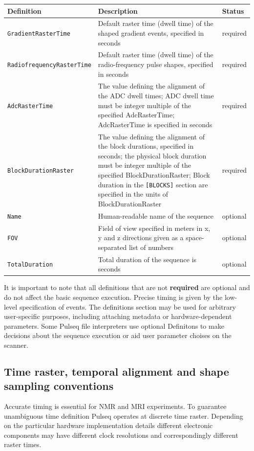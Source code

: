 \documentclass{article}
\begin{document}
\begin{tabularx}{\textwidth}{lXl}
\toprule
Definition & Description & Status\\
\midrule
\verb.GradientRasterTime. & Default raster time (dwell time) of the shaped gradient events, specified in seconds & required \\
\verb.RadiofrequencyRasterTime. & Default raster time (dwell time) of the radio-frequency pulse shapes, specified in seconds & required \\
\verb.AdcRasterTime. & The value defining the alignment of the ADC dwell times; ADC dwell time must be integer multiple of the specified AdcRasterTime; AdcRasterTime is specified in seconds & required \\
\verb.BlockDurationRaster. & The value defining the alignment of the block durations, specified in seconds; the physical block duration must be integer multiple of the specified BlockDurationRaster; Block duration in the \verb.[BLOCKS]. section are specified in the units of BlockDurationRaster  & required\\
\verb.Name. & Human-readable name of the sequence & optional \\
\verb.FOV. & Field of view specified in meters in x, y and z directions given as a space-separated list of numbers & optional\\
\verb.TotalDuration. & Total duration of the sequence is seconds & optional\\
\bottomrule
\end{tabularx}

It is important to note that all definitions that are not  \textbf{required} are optional and do not affect the basic sequence execution. Precise timing is given by the low-level specification of events. The definitions section may be used for arbitrary user-specific purposes, including attaching metadata or hardware-dependent parameters. Some Pulseq file interpreters use optional Definitons to make decisions about the sequence execution or aid user parameter choises on the scanner.

\subsection{Time raster, temporal alignment and shape sampling conventions}

Accurate timing is essential for NMR and MRI experiments. To guarantee 	
unambiguous time definition Pulseq operates at discrete time raster. Depending on the particular hardware implementation details different electronic components may have different clock resolutions and correspondingly different raster times. 
\end{document}
